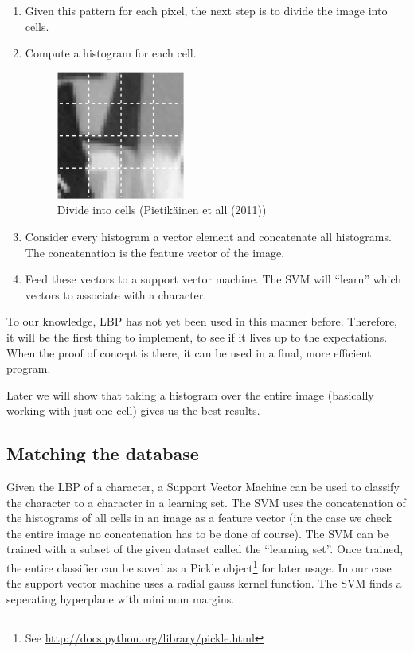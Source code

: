 \documentclass[a4paper]{article}
\begin{document}
\begin{enumerate}
\item Given this pattern for each pixel, the next step is to divide the image
into cells.

\item Compute a histogram for each cell.

\begin{figure}[H]
    \center
    \includegraphics[scale=0.7]{cells.png}
    \caption{Divide into cells (Pietik\"ainen et all (2011))}
\end{figure}

\item Consider every histogram a vector element and concatenate all histograms.
The concatenation is the feature vector of the image.

\item Feed these vectors to a support vector machine. The SVM will ``learn''
which vectors to associate with a character.

\end{enumerate}

To our knowledge, LBP has not yet been used in this manner before. Therefore,
it will be the first thing to implement, to see if it lives up to the
expectations. When the proof of concept is there, it can be used in a final,
more efficient program.

Later we will show that taking a histogram over the entire image (basically
working with just one cell) gives us the best results.

\subsection{Matching the database}

Given the LBP of a character, a Support Vector Machine can be used to classify
the character to a character in a learning set. The SVM uses the concatenation
of the histograms of all cells in an image as a feature vector (in the case we
check the entire image no concatenation has to be done of course). The SVM can
be trained with a subset of the given dataset called the ``learning set''. Once
trained, the entire classifier can be saved as a Pickle object\footnote{See
\url{http://docs.python.org/library/pickle.html}} for later usage.
In our case the support vector machine uses a radial gauss kernel function. The
 SVM finds a seperating hyperplane with minimum margins.
\end{document}
